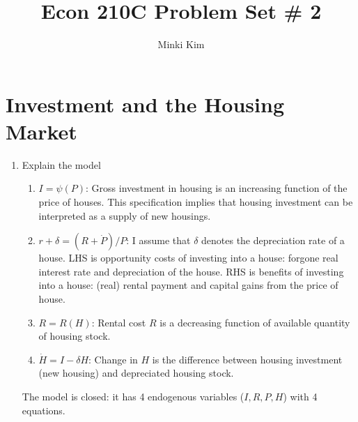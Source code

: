 \documentclass[11pt]{amsart}
\title{Econ 210C Problem Set \# 2}
\author{Minki Kim}
\begin{document}
\maketitle

\section{Investment and the Housing Market}
\begin{enumerate}[label=(\alph*)]
	\item Explain the model 
\begin{enumerate}
	\item $I = \psi (P)$: Gross investment in housing is an increasing function of the price of houses. This specification implies that housing investment can be interpreted as a supply of new housings. 
	\item $r + \delta = (R + \dot{P})/P$: I assume that $\delta$ denotes the depreciation rate of a house. LHS is opportunity costs of investing into a house: forgone real interest rate and depreciation of the house. RHS is benefits of investing into a house: (real) rental payment and capital gains from the price of house. 
	\item $R = R(H)$: Rental cost $R$ is a decreasing function of available quantity of housing stock. 
	\item $\dot{H} = I - \delta H$: Change in $H$ is the difference between housing investment (new housing) and depreciated housing stock. 
\end{enumerate}
The model is closed: it has 4 endogenous variables ($I,R,P,H$) with 4 equations.


\end{enumerate}
\end{document}
